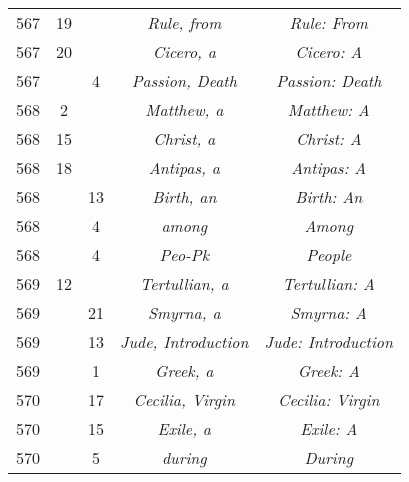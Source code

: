 \documentclass[a4paper,11pt]{article}
\begin{document}
\begin{center}
\begin{tabular}{|c|c|c|c|c|}
    567 & 19 & & \textit{Rule, from} & \textit{Rule: From} \\
    567 & 20 & & \textit{Cicero, a} & \textit{Cicero: A} \\
    567 & &  4 & \emph{Passion, Death} & \emph{Passion: Death} \\
    568 &  2 & & \emph{Matthew, a} & \emph{Matthew: A} \\
    568 & 15 & & \emph{Christ, a} & \emph{Christ: A} \\
    568 & 18 & & \emph{Antipas, a} & \emph{Antipas: A} \\
    568 & & 13 & \emph{Birth, an} & \emph{Birth: An} \\
    568 & &  4 & \emph{among} & \emph{Among} \\
    568 & &  4 & \emph{Peo-Pk} & \emph{People} \\
    569 & 12 & & \emph{Tertullian, a} & \emph{Tertullian: A} \\
    569 & & 21 & \emph{Smyrna, a} & \emph{Smyrna: A} \\
    569 & & 13 & \emph{Jude, Introduction} & \emph{Jude: Introduction} \\
    569 & &  1 & \emph{Greek, a} & \emph{Greek: A} \\
    570 & & 17 & \emph{Cecilia, Virgin} & \emph{Cecilia: Virgin} \\
    570 & & 15 & \emph{Exile, a} & \emph{Exile: A} \\
    570 & &  5 & \emph{during} & \emph{During} \\
    \hline
  \end{tabular}






\end{center}
\end{document}
